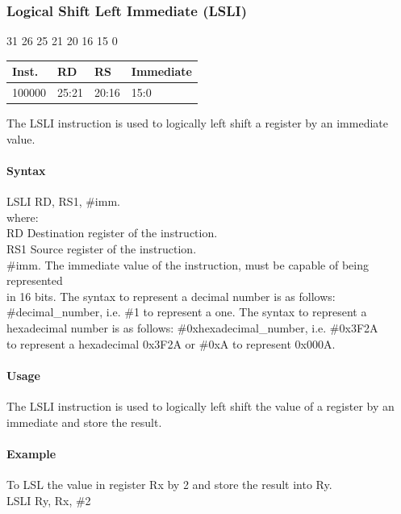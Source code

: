 \documentclass[12pt]{article}
\newcommand{\iTypeInstruction}[6]
{%
    \hspace{1.6cm}31 \hspace{1.15cm}26 \hspace{.05cm}25 \hspace{.8cm}21 \hspace{.05cm}20 \hspace{.8cm}16 \hspace{.05cm}15 \hspace{6.4cm}0
    \vspace{-.25cm}
    \begin{center}
        \begin{tabular}{ |p{1.8cm}|p{1.5cm}|p{1.5cm}|p{6.8cm}| }
            \hline
            \textbf{Inst.} & \textbf{RD} &  \textbf{RS} & \textbf{Immediate}\\
            \hline
            #1 & 25:21 & 20:16 &15:0\\
            \hline
        \end{tabular}
    \end{center}
    
    \noindent
    #2
    
    \paragraph{Syntax}
    \begin{flushleft}
    #3 RD, RS1, \#imm.\\
    \vspace{1em}        %
    where:\\
    \vspace{1em}
    RD  \hspace{3.6em} Destination register of the instruction.\\
    \vspace{1em}
    RS1  \hspace{3.35em} Source register of the instruction.\\
    \vspace{1em}
    \#imm.  \hspace{1.8em} The immediate value of the instruction, must be capable of being represented\\             \hspace{5.4em} in 16 bits. The syntax to represent a decimal number is as follows:\\
            \hspace{5.4em} \#decimal\_number, i.e. \#1 to represent a one. The syntax to represent a\\
            \hspace{5.4em} hexadecimal number is as follows: \#0xhexadecimal\_number, i.e. \#0x3F2A \\
            \hspace{5.4em} to represent a hexadecimal 0x3F2A or \#0xA to represent 0x000A.\\
    \end{flushleft}
    
    \paragraph{Usage}
    \begin{flushleft}
    #4\\
    \end{flushleft}
    \paragraph{Example}
    \begin{flushleft}
    #5\\
    \vspace{1em}
    #6
    \end{flushleft}}
\begin{document}



    \newpage
    \subsubsection{Logical Shift Left Immediate (LSLI)}
    
    \iTypeInstruction
    {100000}
    {The LSLI instruction is used to logically left shift a register by an immediate value.}
    {LSLI}
    {The LSLI instruction is used to logically left shift the value of a register by an immediate and store the result.}
    {To LSL the value in register Rx by 2 and store the result into Ry.}
    {LSLI Ry, Rx, \#2}
    
    
    
\end{document}
